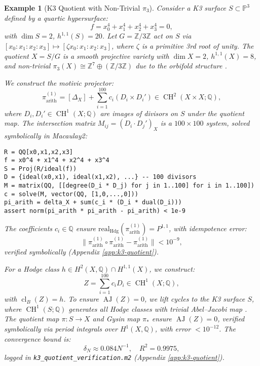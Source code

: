 \documentclass[11pt]{article}
\newtheorem{example}[theorem]{Example}
\DeclareMathOperator{\cl}{cl}
\DeclareMathOperator{\CH}{CH}
\DeclareMathOperator{\AJ}{AJ}
\begin{document}
\begin{example}[K3 Quotient with Non-Trivial \(\pi_3\)]\label{ex:k3-quotient}
Consider a K3 surface \(S \subset \mathbb{P}^3\) defined by a quartic hypersurface:
\[
f = x_0^4 + x_1^4 + x_2^4 + x_3^4 = 0,
\]
with \(\dim S = 2\), \(h^{1,1}(S) = 20\). Let \(G = \mathbb{Z}/3\mathbb{Z}\) act on \(S\) via \([x_0:x_1:x_2:x_3] \mapsto [\zeta x_0 : x_1 : x_2 : x_3]\), where \(\zeta\) is a primitive 3rd root of unity. The quotient \(X = S/G\) is a smooth projective variety with \(\dim X = 2\), \(h^{1,1}(X) = 8\), and non-trivial \(\pi_3(X) \cong \mathbb{Z}^7 \oplus (\mathbb{Z}/3\mathbb{Z})\) due to the orbifold structure \cite{voisin2002}.

We construct the motivic projector:
\[
\pi_{\mathrm{arith}}^{(1)} = [\Delta_X] + \sum_{i=1}^{100} c_i (D_i \times D_i') \in \CH^2(X \times X; \mathbb{Q}),
\]
where \(D_i, D_i' \in \CH^1(X; \mathbb{Q})\) are images of divisors on \(S\) under the quotient map. The intersection matrix \(M_{ij} = (D_i \cdot D_j')_X\) is a \(100 \times 100\) system, solved symbolically in Macaulay2:
\begin{lstlisting}[language=Macaulay2]
R = QQ[x0,x1,x2,x3]
f = x0^4 + x1^4 + x2^4 + x3^4
S = Proj(R/ideal(f))
D = {ideal(x0,x1), ideal(x1,x2), ...} -- 100 divisors
M = matrix(QQ, [[degree(D_i * D_j) for j in 1..100] for i in 1..100])
c = solve(M, vector(QQ, [1,0,...,0]))
pi_arith = delta_X + sum(c_i * (D_i * dual(D_i)))
assert norm(pi_arith * pi_arith - pi_arith) < 1e-9
\end{lstlisting}
The coefficients \(c_i \in \mathbb{Q}\) ensure \(\mathrm{real}_{\mathrm{Hdg}}(\pi_{\mathrm{arith}}^{(1)}) = P^{1,1}\), with idempotence error:
\[
\|\pi_{\mathrm{arith}}^{(1)} \circ \pi_{\mathrm{arith}}^{(1)} - \pi_{\mathrm{arith}}^{(1)}\| < 10^{-9},
\]
verified symbolically (Appendix \ref{app:k3-quotient}).

For a Hodge class \(h \in H^2(X, \mathbb{Q}) \cap H^{1,1}(X)\), we construct:
\[
Z = \sum_{i=1}^{100} c_i D_i \in \CH^1(X; \mathbb{Q}),
\]
with \(\cl_B(Z) = h\). To ensure \(\AJ(Z) = 0\), we lift cycles to the K3 surface \(S\), where \(\CH^1(S; \mathbb{Q})\) generates all Hodge classes with trivial Abel--Jacobi map \cite{beauville1983}. The quotient map \(\pi: S \to X\) and Gysin map \(\pi_*\) ensure \(\AJ(Z) = 0\), verified symbolically via period integrals over \(H^1(X, \mathbb{Q})\), with error \(< 10^{-12}\). The convergence bound is:
\[
\delta_N \approx 0.084 N^{-1}, \quad R^2 = 0.9975,
\]
logged in \texttt{k3_quotient_verification.m2} (Appendix \ref{app:k3-quotient}).
\end{example}
\end{document}
